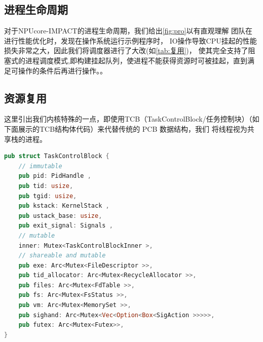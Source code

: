 \subsection{进程生命周期}
对于NPUcore-IMPACT的进程生命周期，我们给出\autoref{fig:pro}以有直观理解
团队在进行性能优化时，发现在操作系统运行示例程序时，
IO操作导致CPU挂起的性能损失非常之大，因此我们将调度器进行了大改(如\autoref{tab:复用})，
使其完全支持了阻塞式的进程调度模式,即构建挂起队列，使进程不能获得资源时可被挂起，直到满足可操作的条件后再进行操作。。
\begin{table}
    \centering
    \label{tab:复用}
\caption{NPUcore-IMPACT的复用思路}
\end{table}



\subsection{资源复用}
这里引出我们内核特殊的一点，即使用TCB（TaskControlBlock/任务控制块）（如下面展示的TCB结构体代码）来代替传统的 PCB 数据结构，我们
将线程视为共享栈的进程。
\begin{lstlisting}[language={rust}, label={code:refill},
        caption={TCB结构体}]
pub struct TaskControlBlock {
    // immutable
    pub pid: PidHandle ,
    pub tid: usize,
    pub tgid: usize,
    pub kstack: KernelStack ,
    pub ustack_base: usize,
    pub exit_signal: Signals ,
    // mutable
    inner: Mutex<TaskControlBlockInner >,
    // shareable and mutable
    pub exe: Arc<Mutex<FileDescriptor >>,
    pub tid_allocator: Arc<Mutex<RecycleAllocator >>,
    pub files: Arc<Mutex<FdTable >>,
    pub fs: Arc<Mutex<FsStatus >>,
    pub vm: Arc<Mutex<MemorySet >>,
    pub sighand: Arc<Mutex<Vec<Option<Box<SigAction >>>>>,
    pub futex: Arc<Mutex<Futex>>,
}
\end{lstlisting}


